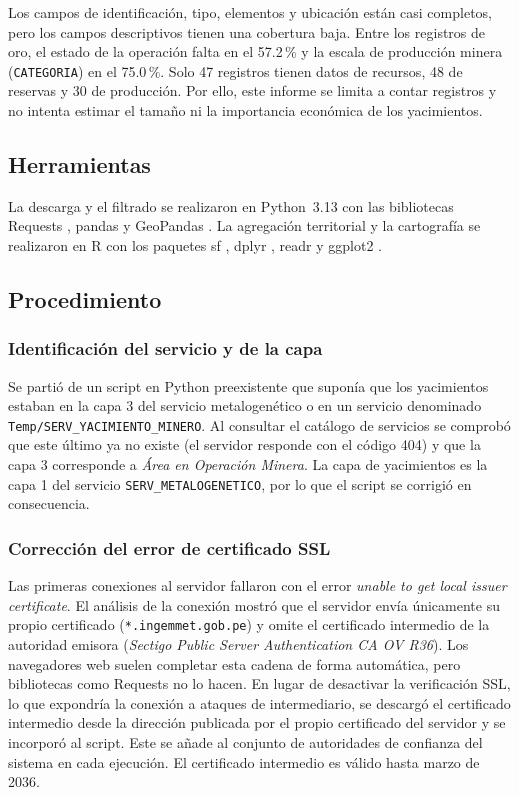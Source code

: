 \documentclass[man,12pt,a4paper,floatsintext,donotrepeattitle]{apa7}
\begin{document}
Los campos de identificación, tipo, elementos y ubicación están casi completos,
pero los campos descriptivos tienen una cobertura baja. Entre los registros de
oro, el estado de la operación falta en el 57.2\,\% y la escala de producción
minera (\texttt{CATEGORIA}) en el 75.0\,\%. Solo 47 registros tienen datos de
recursos, 48 de reservas y 30 de producción. Por ello, este informe se limita a
contar registros y no intenta estimar el tamaño ni la importancia económica de
los yacimientos.

\subsection{Herramientas}

La descarga y el filtrado se realizaron en Python~3.13 con las bibliotecas
Requests \parencite{requests}, pandas \parencite{mckinney2010} y GeoPandas
\parencite{geopandas}. La agregación territorial y la cartografía se realizaron
en R \parencite{rcore2024} con los paquetes sf \parencite{pebesma2018}, dplyr
\parencite{dplyr}, readr \parencite{readr} y ggplot2 \parencite{wickham2016}.

\subsection{Procedimiento}

\subsubsection{Identificación del servicio y de la capa}

Se partió de un script en Python preexistente que suponía que los yacimientos
estaban en la capa 3 del servicio metalogenético o en un servicio denominado
\texttt{Temp/SERV\_YACIMIENTO\_MINERO}. Al consultar el catálogo de servicios se
comprobó que este último ya no existe (el servidor responde con el código 404) y
que la capa 3 corresponde a \textit{Área en Operación Minera}. La capa de
yacimientos es la capa 1 del servicio \texttt{SERV\_METALOGENETICO}, por lo que
el script se corrigió en consecuencia.

\subsubsection{Corrección del error de certificado SSL}

Las primeras conexiones al servidor fallaron con el error
\textit{unable to get local issuer certificate}. El análisis de la conexión
mostró que el servidor envía únicamente su propio certificado
(\texttt{*.ingemmet.gob.pe}) y omite el certificado intermedio de la autoridad
emisora (\textit{Sectigo Public Server Authentication CA OV R36}). Los
navegadores web suelen completar esta cadena de forma automática, pero bibliotecas
como Requests no lo hacen. En lugar de desactivar la verificación SSL, lo que
expondría la conexión a ataques de intermediario, se descargó el certificado
intermedio desde la dirección publicada por el propio certificado del servidor y
se incorporó al script. Este se añade al conjunto de autoridades de confianza del
sistema en cada ejecución. El certificado intermedio es válido hasta marzo de
2036.
\end{document}
